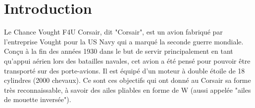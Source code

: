 \documentclass{article}
\begin{document}
\newpage
\tableofcontents

\newpage
\section{Introduction}
Le Chance Vought F4U Corsair, dit "Corsair", est un avion fabriqué par l'entreprise Vought pour la US Navy qui a marqué la seconde guerre mondiale. Conçu à la fin des années 1930 dans le but de servir principalement en tant qu'appui aérien lors des batailles navales, cet avion a été pensé pour pouvoir être transporté sur des porte-avions. Il est équipé d’un moteur à double étoile de 18 cylindres (2000 chevaux). Ce sont ces objectifs qui ont donné au Corsair sa forme très reconnaissable, à savoir des ailes pliables en forme de W (aussi appelée "ailes de mouette inversée").
\end{document}
